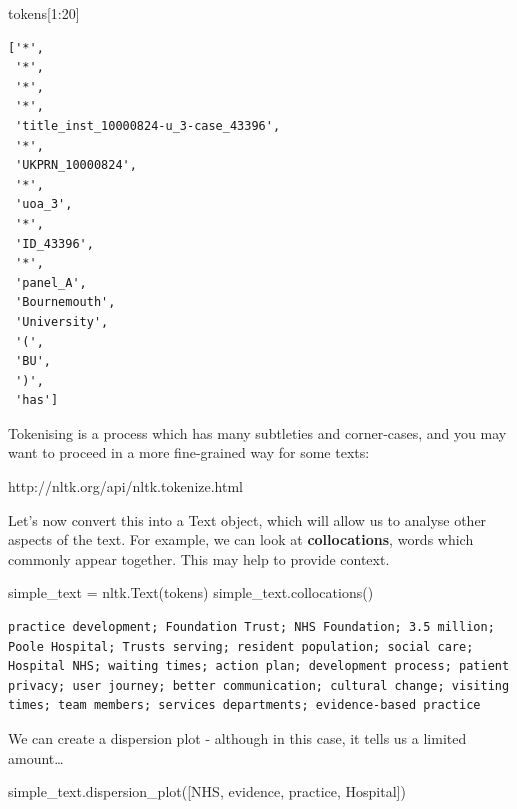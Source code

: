\documentclass[
  letterpaper,
  DIV=11,
  numbers=noendperiod]{scrreprt}
\newenvironment{Shaded}{\begin{snugshade}}{\end{snugshade}}
\newcommand{\DecValTok}[1]{\textcolor[rgb]{0.68,0.00,0.00}{#1}}
\newcommand{\NormalTok}[1]{\textcolor[rgb]{0.00,0.23,0.31}{#1}}
\newcommand{\OperatorTok}[1]{\textcolor[rgb]{0.37,0.37,0.37}{#1}}
\newcommand{\StringTok}[1]{\textcolor[rgb]{0.13,0.47,0.30}{#1}}
\begin{document}
\begin{Shaded}
\begin{Highlighting}[]
\NormalTok{tokens[}\DecValTok{1}\NormalTok{:}\DecValTok{20}\NormalTok{]}
\end{Highlighting}
\end{Shaded}

\begin{verbatim}
['*',
 '*',
 '*',
 '*',
 'title_inst_10000824-u_3-case_43396',
 '*',
 'UKPRN_10000824',
 '*',
 'uoa_3',
 '*',
 'ID_43396',
 '*',
 'panel_A',
 'Bournemouth',
 'University',
 '(',
 'BU',
 ')',
 'has']
\end{verbatim}

Tokenising is a process which has many subtleties and corner-cases, and
you may want to proceed in a more fine-grained way for some texts:

http://nltk.org/api/nltk.tokenize.html

Let's now convert this into a Text object, which will allow us to
analyse other aspects of the text. For example, we can look at
\textbf{collocations}, words which commonly appear together. This may
help to provide context.

\begin{Shaded}
\begin{Highlighting}[]
\NormalTok{simple\_text }\OperatorTok{=}\NormalTok{ nltk.Text(tokens)}
\NormalTok{simple\_text.collocations()}
\end{Highlighting}
\end{Shaded}

\begin{verbatim}
practice development; Foundation Trust; NHS Foundation; 3.5 million;
Poole Hospital; Trusts serving; resident population; social care;
Hospital NHS; waiting times; action plan; development process; patient
privacy; user journey; better communication; cultural change; visiting
times; team members; services departments; evidence-based practice
\end{verbatim}

We can create a dispersion plot - although in this case, it tells us a
limited amount\ldots{}

\begin{Shaded}
\begin{Highlighting}[]
\NormalTok{simple\_text.dispersion\_plot([}\StringTok{\textquotesingle{}NHS\textquotesingle{}}\NormalTok{, }\StringTok{\textquotesingle{}evidence\textquotesingle{}}\NormalTok{, }\StringTok{\textquotesingle{}practice\textquotesingle{}}\NormalTok{, }\StringTok{\textquotesingle{}Hospital\textquotesingle{}}\NormalTok{])}
\end{Highlighting}
\end{Shaded}
\end{document}
